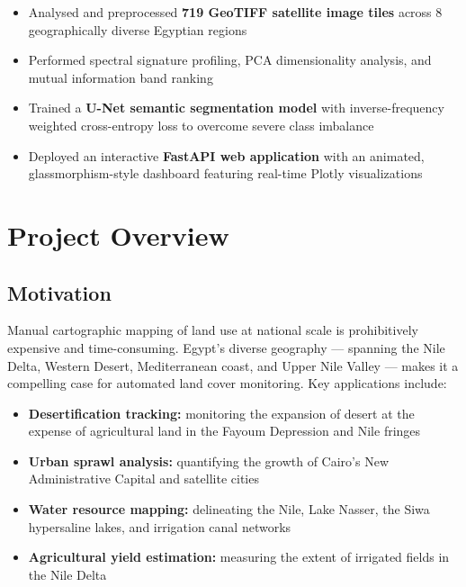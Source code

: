 \documentclass[12pt, a4paper]{article}
\begin{document}
\begin{keybox}
\begin{itemize}[leftmargin=*, noitemsep]
  \item Analysed and preprocessed \textbf{719 GeoTIFF satellite image tiles} across 8 geographically diverse Egyptian regions
  \item Performed spectral signature profiling, PCA dimensionality analysis, and mutual information band ranking
  \item Trained a \textbf{U-Net semantic segmentation model} with inverse-frequency weighted cross-entropy loss to overcome severe class imbalance
  \item Deployed an interactive \textbf{FastAPI web application} with an animated, glassmorphism-style dashboard featuring real-time Plotly visualizations
\end{itemize}
\end{keybox}

\section{Project Overview}

\subsection{Motivation}

Manual cartographic mapping of land use at national scale is prohibitively expensive and time-consuming. Egypt's diverse geography — spanning the Nile Delta, Western Desert, Mediterranean coast, and Upper Nile Valley — makes it a compelling case for automated land cover monitoring. Key applications include:

\begin{itemize}
  \item \textbf{Desertification tracking:} monitoring the expansion of desert at the expense of agricultural land in the Fayoum Depression and Nile fringes
  \item \textbf{Urban sprawl analysis:} quantifying the growth of Cairo's New Administrative Capital and satellite cities
  \item \textbf{Water resource mapping:} delineating the Nile, Lake Nasser, the Siwa hypersaline lakes, and irrigation canal networks
  \item \textbf{Agricultural yield estimation:} measuring the extent of irrigated fields in the Nile Delta
\end{itemize}
\end{document}
